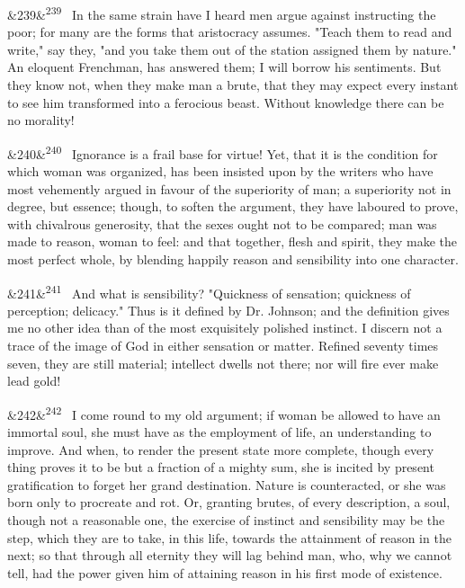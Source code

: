 \documentclass[12pt]{article}
\newcommand{\para}[1][]{\par\noindent\ifx&#1&\else\textsuperscript{\footnotesize #1}~\fi}
\begin{document}
\para[239] In the same strain have I heard men argue against instructing the poor; for many are the forms that aristocracy assumes. "Teach them to read and write," say they, "and you take them out of the station assigned them by nature." An eloquent Frenchman, has answered them; I will borrow his sentiments. But they know not, when they make man a brute, that they may expect every instant to see him transformed into a ferocious beast. Without knowledge there can be no morality!

\para[240] Ignorance is a frail base for virtue! Yet, that it is the condition for which woman was organized, has been insisted upon by the writers who have most vehemently argued in favour of the superiority of man; a superiority not in degree, but essence; though, to soften the argument, they have laboured to prove, with chivalrous generosity, that the sexes ought not to be compared; man was made to reason, woman to feel: and that together, flesh and spirit, they make the most perfect whole, by blending happily reason and sensibility into one character.

\para[241] And what is sensibility? "Quickness of sensation; quickness of perception; delicacy." Thus is it defined by Dr. Johnson; and the definition gives me no other idea than of the most exquisitely polished instinct. I discern not a trace of the image of God in either sensation or matter. Refined seventy times seven, they are still material; intellect dwells not there; nor will fire ever make lead gold!

\para[242] I come round to my old argument; if woman be allowed to have an immortal soul, she must have as the employment of life, an understanding to improve. And when, to render the present state more complete, though every thing proves it to be but a fraction of a mighty sum, she is incited by present gratification to forget her grand destination. Nature is counteracted, or she was born only to procreate and rot. Or, granting brutes, of every description, a soul, though not a reasonable one, the exercise of instinct and sensibility may be the step, which they are to take, in this life, towards the attainment of reason in the next; so that through all eternity they will lag behind man, who, why we cannot tell, had the power given him of attaining reason in his first mode of existence.
\end{document}
